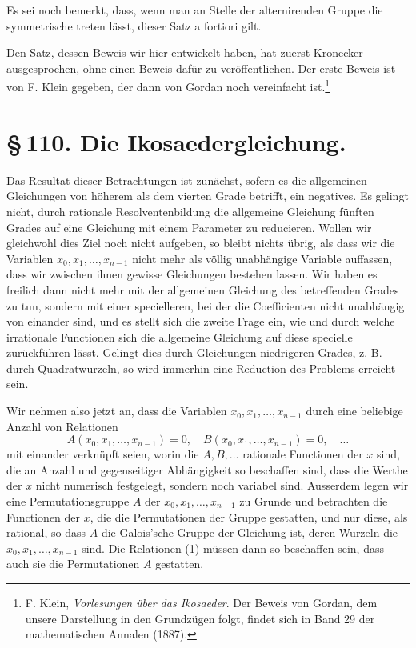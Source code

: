 \documentclass[11pt]{article}
\begin{document}
Es sei noch bemerkt, dass, wenn man an Stelle der alternirenden Gruppe die symmetrische treten lässt, dieser Satz a fortiori gilt.

Den Satz, dessen Beweis wir hier entwickelt haben, hat zuerst Kronecker ausgesprochen, ohne einen Beweis dafür zu veröffentlichen. Der erste Beweis ist von F. Klein gegeben, der dann von Gordan noch vereinfacht ist.\footnote{F. Klein, \emph{Vorlesungen über das Ikosaeder}. Der Beweis von Gordan, dem unsere Darstellung in den Grundzügen folgt, findet sich in Band 29 der mathematischen Annalen (1887).}

\section*{\S\,110. Die Ikosaedergleichung.}

Das Resultat dieser Betrachtungen ist zunächst, sofern es die allgemeinen Gleichungen von höherem als dem vierten Grade betrifft, ein negatives. Es gelingt nicht, durch rationale Resolventenbildung die allgemeine Gleichung fünften Grades auf eine Gleichung mit einem Parameter zu reducieren. Wollen wir gleichwohl dies Ziel noch nicht aufgeben, so bleibt nichts übrig, als dass wir die Variablen \(x_0,x_1,\ldots,x_{n-1}\) nicht mehr als völlig unabhängige Variable auffassen, dass wir zwischen ihnen gewisse Gleichungen bestehen lassen. Wir haben es freilich dann nicht mehr mit der allgemeinen Gleichung des betreffenden Grades zu tun, sondern mit einer specielleren, bei der die Coefficienten nicht unabhängig von einander sind, und es stellt sich die zweite Frage ein, wie und durch welche irrationale Functionen sich die allgemeine Gleichung auf diese specielle zurückführen lässt. Gelingt dies durch Gleichungen niedrigeren Grades, z. B. durch Quadratwurzeln, so wird immerhin eine Reduction des Problems erreicht sein.

Wir nehmen also jetzt an, dass die Variablen \(x_0,x_1,\ldots,x_{n-1}\) durch eine beliebige Anzahl von Relationen
\begin{equation}
A(x_0,x_1,\ldots,x_{n-1})=0,\quad
B(x_0,x_1,\ldots,x_{n-1})=0,\quad\ldots
\tag{1}
\end{equation}
mit einander verknüpft seien, worin die \(A,B,\ldots\) rationale Functionen der \(x\) sind, die an Anzahl und gegenseitiger Abhängigkeit so beschaffen sind, dass die Werthe der \(x\) nicht numerisch festgelegt, sondern noch variabel sind. Ausserdem legen wir eine Permutationsgruppe \(A\) der \(x_0,x_1,\ldots,x_{n-1}\) zu Grunde und betrachten die Functionen der \(x\), die die Permutationen der Gruppe gestatten, und nur diese, als rational, so dass \(A\) die Galois'sche Gruppe der Gleichung ist, deren Wurzeln die \(x_0,x_1,\ldots,x_{n-1}\) sind. Die Relationen (1) müssen dann so beschaffen sein, dass auch sie die Permutationen \(A\) gestatten.
\end{document}
